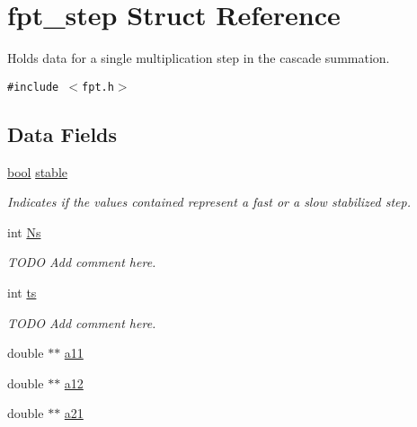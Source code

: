 \hypertarget{structfpt__step}{
\section{fpt\_\-step Struct Reference}
\label{structfpt__step}
}
Holds data for a single multiplication step in the cascade summation.  


{\tt \#include $<$fpt.h$>$}

\subsection*{Data Fields}
\begin{CompactItemize}
\item 
\hyperlink{group__nfsft_gf6a258d8f3ee5206d682d799316314b1}{bool} \hyperlink{structfpt__step_3923c1a18d2a92dc3213d4ce7ac9c72d}{stable}
\begin{CompactList}\small\item\em Indicates if the values contained represent a fast or a slow stabilized step. \item\end{CompactList}\item 
int \hyperlink{structfpt__step_d3011a98797dae243ce3ba74dbf65c54}{Ns}
\begin{CompactList}\small\item\em TODO Add comment here. \item\end{CompactList}\item 
int \hyperlink{structfpt__step_b3999986507dba7bcdd28be976a90029}{ts}
\begin{CompactList}\small\item\em TODO Add comment here. \item\end{CompactList}\item 
\hypertarget{structfpt__step_a8244629c19851a1266b09faf47bfcaf}{
double $\ast$$\ast$ \hyperlink{structfpt__step_a8244629c19851a1266b09faf47bfcaf}{a11}}
\label{structfpt__step_a8244629c19851a1266b09faf47bfcaf}

\item 
\hypertarget{structfpt__step_1060867d4bc8e09bdf096435eb44b0f8}{
double $\ast$$\ast$ \hyperlink{structfpt__step_1060867d4bc8e09bdf096435eb44b0f8}{a12}}
\label{structfpt__step_1060867d4bc8e09bdf096435eb44b0f8}

\item 
\hypertarget{structfpt__step_d6c59e78ee4cec37a1dc6a1d42576059}{
double $\ast$$\ast$ \hyperlink{structfpt__step_d6c59e78ee4cec37a1dc6a1d42576059}{a21}}
\label{structfpt__step_d6c59e78ee4cec37a1dc6a1d42576059}


\end{CompactItemize}

